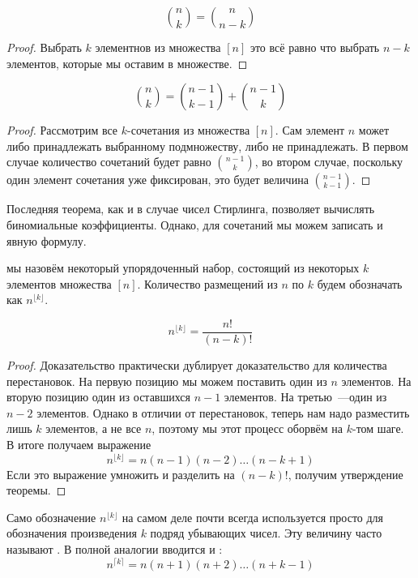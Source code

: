 \begin{thm}
$${n \choose k} = {n \choose n-k}$$
\end{thm}
\begin{proof}
Выбрать $k$ элементнов из множества $[n]$ это всё равно что выбрать $n-k$ элементов, которые мы оставим в множестве.
\end{proof}

\begin{thm}
$${n \choose k} = {n-1 \choose k-1} + {n - 1 \choose k}$$
\end{thm}

\begin{proof}
Рассмотрим все $k$-сочетания из множества $[n]$. Сам элемент $n$ может либо принадлежать выбранному подмножеству, либо не принадлежать. В первом случае количество сочетаний будет равно $n-1\choose k$, во втором случае, поскольку один элемент сочетания уже фиксирован, это будет величина $n-1\choose k - 1$.
\end{proof}

Последняя теорема, как и в случае чисел Стирлинга, позволяет вычислять биномиальные коэффициенты. Однако, для сочетаний мы можем записать и явную формулу.

\begin{definition}
 мы назовём некоторый упорядоченный набор, состоящий из некоторых $k$ элементов множества $[n]$. Количество размещений из $n$ по $k$ будем обозначать как $n^{\lfloor k\rfloor}$.
\end{definition}

\begin{thm}
$$n^{\lfloor k \rfloor} = \frac{n!}{(n-k)!}$$
\end{thm}
\begin{proof}
Доказательство практически дублирует доказательство для количества перестановок. На первую позицию мы можем поставить один из $n$ элементов. На вторую позицию один из оставшихся $n-1$ элементов. На третью~---один из $n-2$ элементов. Однако в отличии от перестановок, теперь нам надо разместить лишь $k$ элементов, а не все $n$, поэтому мы этот процесс оборвём на $k$-том шаге. В итоге получаем выражение
$$n^{\lfloor k \rfloor} = n (n-1)  (n-2) \ldots (n-k+1)$$
Если это выражение умножить и разделить на $(n-k)!$, получим утверждение теоремы.
\end{proof}

Само обозначение $n^{\lfloor k \rfloor}$ на самом деле почти всегда используется просто для обозначения произведения $k$ подряд убывающих чисел. Эту величину часто называют . В полной аналогии вводится и :
$$n^{\lceil k \rceil} = n(n+1)(n+2)\ldots(n+k-1)$$

